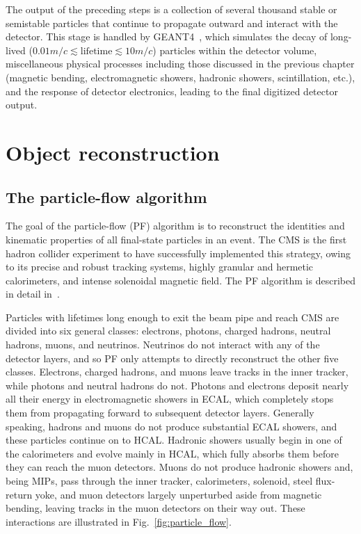 \documentclass[oneside, letterpaper, 12pt, oldfontcommands]{memoir}
\begin{document}
The output of the preceding steps is a collection of several thousand stable or semistable particles that continue to propagate outward and interact
with the detector. This stage is handled by GEANT4~\cite{ref:S0168-9002(03)01368-8}, which simulates the decay of long-lived
($0.01\unit{m}/c \lesssim \mathrm{lifetime} \lesssim 10\unit{m}/c$) particles within the detector volume, miscellaneous physical processes including those
discussed in the previous chapter (magnetic bending, electromagnetic showers, hadronic showers, scintillation, etc.), and the response of detector electronics,
leading to the final digitized detector output.

\chapter{Object reconstruction} \label{chap:reconstruction}
\section{The particle-flow algorithm} \label{sec:reconstruction_particle_flow}
The goal of the particle-flow (PF) algorithm is to reconstruct the identities and kinematic properties of all
final-state particles in an event. The CMS is the first hadron collider experiment to have successfully implemented this strategy,
owing to its precise and robust tracking systems, highly granular and hermetic calorimeters, and intense solenoidal magnetic field.
The PF algorithm is described in detail in~\cite{ref:1748-0221/12/10/P10003}.

Particles with lifetimes long enough to exit the beam pipe and reach CMS are divided into six general classes:
electrons, photons, charged hadrons, neutral hadrons, muons, and neutrinos.
Neutrinos do not interact with any of the detector layers, and so PF only attempts to directly reconstruct the other five classes.
Electrons, charged hadrons, and muons leave tracks in the inner tracker, while photons and neutral hadrons do not. Photons and electrons
deposit nearly all their energy in electromagnetic showers in ECAL, which completely stops them from propagating forward to subsequent
detector layers. Generally speaking, hadrons and muons do not produce substantial ECAL showers, and these particles continue on to HCAL.
Hadronic showers usually begin in one of the calorimeters and evolve mainly in HCAL, which fully absorbs them before they can reach the muon detectors.
Muons do not produce hadronic showers and, being MIPs, pass through the inner tracker, calorimeters, solenoid, steel flux-return yoke,
and muon detectors largely unperturbed aside from magnetic bending, leaving tracks in the muon detectors on their way out.
These interactions are illustrated in Fig.~\ref{fig:particle_flow}.
\end{document}
